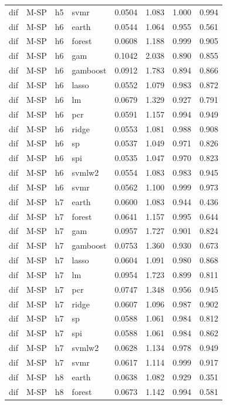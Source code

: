 \begin{ThreePartTable}
\begin{longtable}[t]{llclcccc}
dif & M-SP & h5 & svmr & 0.0504 & 1.083 & 1.000 & 0.994\\
\addlinespace
dif & M-SP & h6 & earth & 0.0544 & 1.064 & 0.955 & 0.561\\
dif & M-SP & h6 & forest & 0.0608 & 1.188 & 0.999 & 0.905\\
dif & M-SP & h6 & gam & 0.1042 & 2.038 & 0.890 & 0.855\\
dif & M-SP & h6 & gamboost & 0.0912 & 1.783 & 0.894 & 0.866\\
dif & M-SP & h6 & lasso & 0.0552 & 1.079 & 0.983 & 0.872\\
dif & M-SP & h6 & lm & 0.0679 & 1.329 & 0.927 & 0.791\\
dif & M-SP & h6 & pcr & 0.0591 & 1.157 & 0.994 & 0.949\\
dif & M-SP & h6 & ridge & 0.0553 & 1.081 & 0.988 & 0.908\\
dif & M-SP & h6 & sp & 0.0537 & 1.049 & 0.971 & 0.826\\
dif & M-SP & h6 & spi & 0.0535 & 1.047 & 0.970 & 0.823\\
dif & M-SP & h6 & svmlw2 & 0.0554 & 1.083 & 0.983 & 0.945\\
dif & M-SP & h6 & svmr & 0.0562 & 1.100 & 0.999 & 0.973\\
\addlinespace
dif & M-SP & h7 & earth & 0.0600 & 1.083 & 0.944 & 0.436\\
dif & M-SP & h7 & forest & 0.0641 & 1.157 & 0.995 & 0.644\\
dif & M-SP & h7 & gam & 0.0957 & 1.727 & 0.901 & 0.824\\
dif & M-SP & h7 & gamboost & 0.0753 & 1.360 & 0.930 & 0.673\\
dif & M-SP & h7 & lasso & 0.0604 & 1.091 & 0.980 & 0.868\\
dif & M-SP & h7 & lm & 0.0954 & 1.723 & 0.899 & 0.811\\
dif & M-SP & h7 & pcr & 0.0747 & 1.348 & 0.956 & 0.945\\
dif & M-SP & h7 & ridge & 0.0607 & 1.096 & 0.987 & 0.902\\
dif & M-SP & h7 & sp & 0.0588 & 1.061 & 0.984 & 0.812\\
dif & M-SP & h7 & spi & 0.0588 & 1.061 & 0.984 & 0.862\\
dif & M-SP & h7 & svmlw2 & 0.0628 & 1.134 & 0.978 & 0.949\\
dif & M-SP & h7 & svmr & 0.0617 & 1.114 & 0.999 & 0.917\\
\addlinespace
dif & M-SP & h8 & earth & 0.0638 & 1.082 & 0.929 & 0.351\\
dif & M-SP & h8 & forest & 0.0673 & 1.142 & 0.994 & 0.581\\

\end{longtable}
\end{ThreePartTable}
